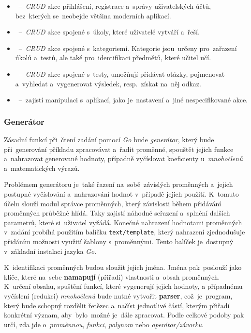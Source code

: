 \documentclass[10pt,a4paper]{article}
\newcommand{\harddata}[1]{\boxed{\texttt{#1}}}
\begin{document}
            \begin{itemize}
                \item \harddata{User}~--~\emph{CRUD} akce přihlášení, registrace a~správy uživatelských účtů, bez~kterých se~neobejde většina moderních aplikací.
                \item \harddata{Task}~--~\emph{CRUD} akce spojené s~úkoly, které uživatelé vytváří a~řeší.
                \item \harddata{Category}~--~\emph{CRUD} akce spojené s~kategoriemi. Kategorie jsou~určeny pro~zařazení úkolů a~testů, ale také pro~identifikaci předmětů, které učitel učí.
                \item \harddata{Test}~--~\emph{CRUD} akce spojené s~testy, umožňují přidávat otázky, pojmenovat a~vyhledat a~vygenerovat výsledek, resp.~získat na~něj odkaz.
                \item \harddata{App}~--~zajistí manipulaci s~aplikací, jako je~nastavení a~jiné nespecifikované akce.
            \end{itemize}

        \subsubsection{Generátor}
            Zásadní funkcí při~čtení zadání pomocí \emph{Go} bude \emph{generátor}, který bude při~generování příkladu zpracovávat a~řadit proměnné, spouštět jejich funkce a~nahrazovat generované hodnoty, případně vyčíslovat koeficienty u~\emph{mnohočlenů} a~matematických výrazů.
            
            Problémem generátoru je~také řazení na~sobě~závislých proměnných a~jejich postupné vyčíslování a~nahrazování hodnot v~případě jejich použití. K~tomuto účelu slouží modul správce proměnných, který závislosti během přidávání proměnných průběžně hlídá. Taky zajistí náhodné seřazení a~splnění dalších parametrů, které si~uživatel vyžádá. Konečné nahrazení hodnotami proměnných v~zadání probíhá použitím balíčku \texttt{text/template}, který nahrazení zjednodušuje přidáním možnosti využití šablony s~proměnnými. Tento balíček je~dostupný v~základní instalaci jazyka \emph{Go}.

            K~identifikaci proměnných budou sloužit jejich jména. Jména pak~poslouží jako klíče, které na~sebe \textbf{namapují} (přiřadí) vlastnosti a~obsah proměnných. K~určení obsahu, spuštění funkcí, které vygenerují jejich hodnoty, a případnému vyčíslení (redukci) \emph{mnohočlenů} bude nutné vytvořit \textbf{parser}, což~je~program, který bude schopný rozdělit řetězec a~načíst jednotlivé částí, kterým přiřadí konkrétní význam, aby~bylo~možné je~dále zpracovat. Podle celkové podoby pak určí, zda jde o~\emph{proměnnou}, \emph{funkci}, \emph{polynom} nebo \emph{operátor/závorku}.
            
\end{document}
